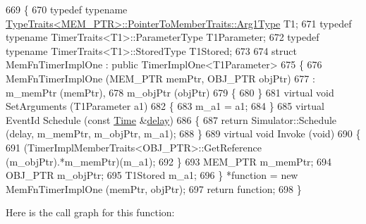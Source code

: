 \begin{DoxyCode}
669 \{
670   \textcolor{keyword}{typedef} \textcolor{keyword}{typename} \hyperlink{structTypeTraits}{TypeTraits<MEM\_PTR>::PointerToMemberTraits::Arg1Type}
       T1;
671   \textcolor{keyword}{typedef} \textcolor{keyword}{typename} TimerTraits<T1>::ParameterType T1Parameter;
672   \textcolor{keyword}{typedef} \textcolor{keyword}{typename} TimerTraits<T1>::StoredType T1Stored;
673 
674   \textcolor{keyword}{struct }MemFnTimerImplOne : \textcolor{keyword}{public} TimerImplOne<T1Parameter>
675   \{
676     MemFnTimerImplOne (MEM\_PTR memPtr, OBJ\_PTR objPtr)
677       : m\_memPtr (memPtr),
678         m\_objPtr (objPtr)
679     \{
680     \}
681     \textcolor{keyword}{virtual} \textcolor{keywordtype}{void} SetArguments (T1Parameter a1)
682     \{
683       m\_a1 = a1;
684     \}
685     \textcolor{keyword}{virtual} EventId Schedule (\textcolor{keyword}{const} \hyperlink{namespacens3_1_1TracedValueCallback_a7ffd3e7c142ffe7c8a1d2db9b8de38ec}{Time} &\hyperlink{lte_2model_2fading-traces_2fading__trace__generator_8m_a7964e6aa8f61a9d28973c8267a606ad8}{delay})
686     \{
687       \textcolor{keywordflow}{return} Simulator::Schedule (delay, m\_memPtr, m\_objPtr, m\_a1);
688     \}
689     \textcolor{keyword}{virtual} \textcolor{keywordtype}{void} Invoke (\textcolor{keywordtype}{void})
690     \{
691       (TimerImplMemberTraits<OBJ\_PTR>::GetReference (m\_objPtr).*m\_memPtr)(m\_a1);
692     \}
693     MEM\_PTR m\_memPtr;
694     OBJ\_PTR m\_objPtr;
695     T1Stored m\_a1;
696   \} *\textcolor{keyword}{function} = \textcolor{keyword}{new} MemFnTimerImplOne (memPtr, objPtr);
697   \textcolor{keywordflow}{return} \textcolor{keyword}{function};
698 \}
\end{DoxyCode}


Here is the call graph for this function\+:


